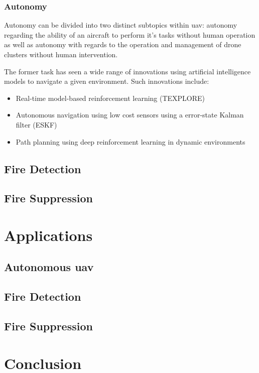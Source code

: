 \documentclass[runningheads]{llncs}
\begin{document}
\subsubsection{Autonomy}

Autonomy can be divided into two distinct subtopics within \acrshort{uav}: autonomy regarding the ability of an aircraft to perform it's tasks without human operation as well as autonomy with regards to the operation and management of drone clusters without human intervention.

The former task has seen a wide range of innovations using artificial intelligence models to navigate a given environment. Such innovations include:

\begin{itemize}
	\item Real-time model-based reinforcement learning (TEXPLORE) \cite{7838739}
	\item Autonomous navigation using low cost sensors using a error-state Kalman filter (ESKF) \cite{Youn2021}
	\item Path planning using deep reinforcement learning in dynamic environments \cite{ZHANG2022108194}
\end{itemize}
\subsection{Fire Detection}

\subsection{Fire Suppression}

\section{Applications}

\subsection{Autonomous \acrshort{uav}}

\subsection{Fire Detection}

\subsection{Fire Suppression}

\section{Conclusion}


\end{document}
